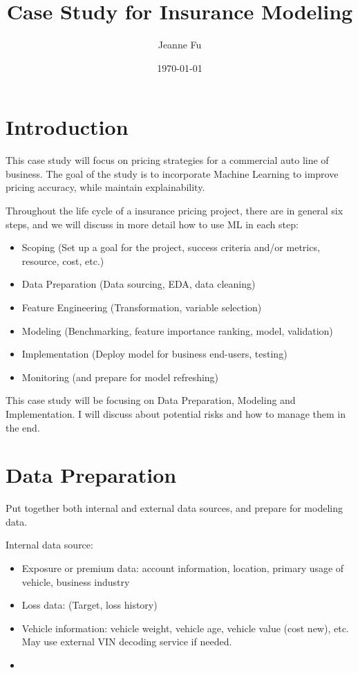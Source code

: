\documentclass{article}
\title{Case Study for Insurance Modeling}
\author{Jeanne Fu}
\date{\today}
\begin{document}
\maketitle

\section{Introduction}
This case study will focus on pricing strategies for a commercial auto line of business. The goal of the study is to incorporate Machine Learning to improve pricing accuracy, while maintain explainability.

Throughout the life cycle of a insurance pricing project, there are in general six steps, and we will discuss in more detail how to use ML in each step:

\begin{itemize}
    \item Scoping (Set up a goal for the project, success criteria and/or metrics, resource, cost, etc.)
    \item Data Preparation (Data sourcing, EDA, data cleaning)
    \item Feature Engineering (Transformation, variable selection)
    \item Modeling (Benchmarking, feature importance ranking, model, validation)
    \item Implementation (Deploy model for business end-users, testing)
    \item Monitoring (and prepare for model refreshing)
\end{itemize}

This case study will be focusing on Data Preparation, Modeling and Implementation. I will discuss about potential risks and how to manage them in the end.

\section{Data Preparation}
Put together both internal and external data sources, and prepare for modeling data.

Internal data source:
\begin{itemize}
    \item Exposure or premium data: account information, location, primary usage of vehicle, business industry
    \item Loss data: (Target, loss history)
    \item Vehicle information: vehicle weight, vehicle age, vehicle value (cost new), etc. May use external VIN decoding service if needed.
    \item     
\end{itemize}
\end{document}
